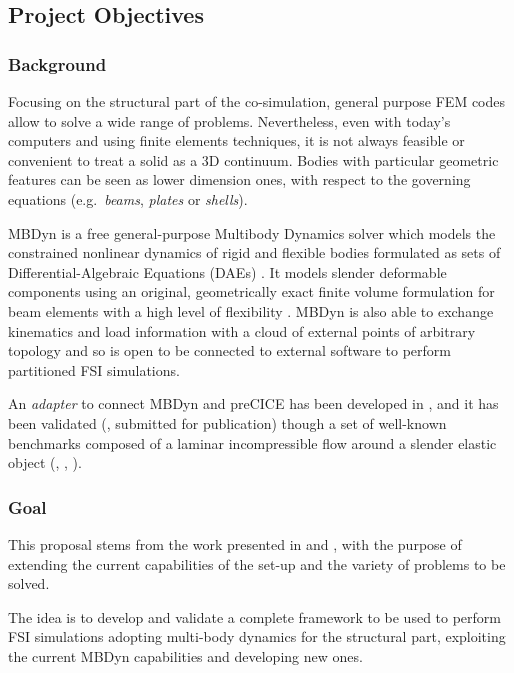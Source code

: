 \subsection*{Project Objectives}


\subsubsection*{Background}

Focusing on the structural part of the co-simulation, general purpose FEM codes allow to solve a wide range of problems. Nevertheless, even with today's computers and using finite elements techniques, it is not always feasible or convenient to treat a solid as a 3D continuum. Bodies with particular geometric features can be seen as lower dimension ones, with respect to the governing equations \cite{hjelmstad2007fundamentals} (e.g.\ \textit{beams}, \textit{plates} or \textit{shells}).

MBDyn is a free general-purpose Multibody Dynamics solver which models the constrained nonlinear dynamics of rigid and flexible bodies formulated as sets of Differential-Algebraic Equations (DAEs) \cite{masarati2014efficient}. It models slender deformable components using an original, geometrically exact finite volume formulation for beam elements with a high level of flexibility \cite{ghiringhelli2000multibody,bauchau2016validation}. MBDyn is also able to exchange kinematics and load information with a cloud of external points of arbitrary topology \cite{quaranta2005conservative} and so is open to be connected to external software to perform partitioned FSI simulations.

An \textit{adapter} to connect MBDyn and preCICE has been developed in \cite{caccia2020master}, and it has been validated (\cite{caccia2021coupling}, submitted for publication) though a set of well-known benchmarks composed of a laminar incompressible flow around a slender elastic object (\cite{ramm1998fluid}, \cite{turek2006proposal}, \cite{turek2010numerical}).

\subsubsection*{Goal}

This proposal stems from the work presented in \cite{caccia2020master} and \cite{caccia2021coupling}, with the purpose of extending the current capabilities of the set-up and the variety of problems to be solved.

The idea is to develop and validate a complete framework to be used to perform FSI simulations adopting multi-body dynamics for the structural part, exploiting the current MBDyn capabilities and developing new ones.

